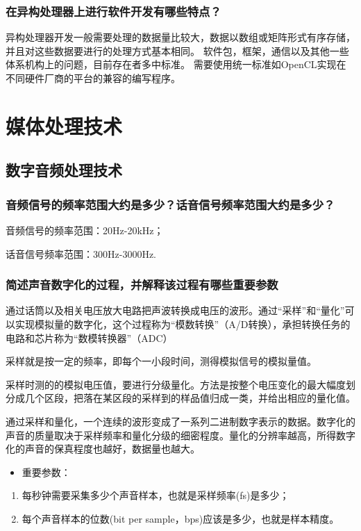 \documentclass[UTF8,a4paper,AutoFakeBold,AutoFakeSlant]{ctexart}
\begin{document}
\subsubsection{在异构处理器上进行软件开发有哪些特点？}
异构处理器开发一般需要处理的数据量比较大，数据以数组或矩阵形式有序存储，并且对这些数据要进行的处理方式基本相同。
软件包，框架，通信以及其他一些体系机构上的问题，目前存在者多中标准。
需要使用统一标准如OpenCL实现在不同硬件厂商的平台的兼容的编写程序。







\section{媒体处理技术}


\subsection{数字音频处理技术}
\subsubsection{音频信号的频率范围大约是多少？话音信号频率范围大约是多少？}

音频信号的频率范围：20Hz-20kHz；

话音信号频率范围：300Hz-3000Hz.


\subsubsection{简述声音数字化的过程，并解释该过程有哪些重要参数}

通过话筒以及相关电压放大电路把声波转换成电压的波形。通过“采样”和“量化”可以实现模拟量的数字化，这个过程称为“模数转换”（A/D转换），承担转换任务的电路和芯片称为“数模转换器”（ADC）

采样就是按一定的频率，即每个一小段时间，测得模拟信号的模拟量值。

采样时测的的模拟电压值，要进行分级量化。方法是按整个电压变化的最大幅度划分成几个区段，把落在某区段的采样到的样品值归成一类，并给出相应的量化值。

通过采样和量化，一个连续的波形变成了一系列二进制数字表示的数据。数字化的声音的质量取决于采样频率和量化分级的细密程度。量化的分辨率越高，所得数字化的声音的保真程度也越好，数据量也越大。

\begin{itemize}
  \item 重要参数：
\end{itemize}
\begin{enumerate}
  \item 每秒钟需要采集多少个声音样本，也就是采样频率(fs)是多少；
  \item 每个声音样本的位数(bit per sample，bps)应该是多少，也就是样本精度。
\end{enumerate}
\end{document}
